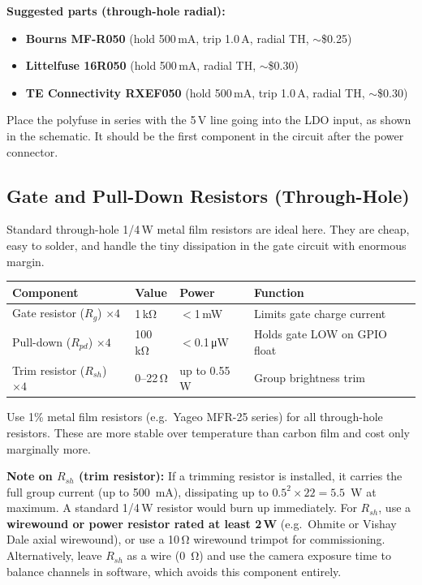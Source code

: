 \documentclass[12pt,letterpaper]{article}
\begin{document}
\textbf{Suggested parts (through-hole radial):}
\begin{itemize}[leftmargin=2em]
  \item \textbf{Bourns MF-R050} (hold 500\,mA, trip 1.0\,A, radial TH, $\sim$\$0.25)
  \item \textbf{Littelfuse 16R050} (hold 500\,mA, radial TH, $\sim$\$0.30)
  \item \textbf{TE Connectivity RXEF050} (hold 500\,mA, trip 1.0\,A, radial TH, $\sim$\$0.30)
\end{itemize}

Place the polyfuse in series with the 5\,V line going into the LDO input, as shown in
the schematic. It should be the first component in the circuit after the power connector.

\subsection{Gate and Pull-Down Resistors (Through-Hole)}

Standard through-hole 1/4\,W metal film resistors are ideal here. They are cheap, easy
to solder, and handle the tiny dissipation in the gate circuit with enormous margin.

\begin{center}
\begin{tabular}{llll}
\toprule
\textbf{Component} & \textbf{Value} & \textbf{Power} & \textbf{Function} \\
\midrule
Gate resistor ($R_g$) $\times 4$ & 1\,k\si{\ohm} & $<$1\,mW & Limits gate charge current \\
Pull-down ($R_{pd}$) $\times 4$ & 100\,k\si{\ohm} & $<$0.1\,\si{\micro W} & Holds gate LOW on GPIO float \\
Trim resistor ($R_{sh}$) $\times 4$ & 0--22\,\si{\ohm} & up to 0.55\,W & Group brightness trim \\
\bottomrule
\end{tabular}
\end{center}

Use 1\% metal film resistors (e.g.\ Yageo MFR-25 series) for all through-hole resistors.
These are more stable over temperature than carbon film and cost only marginally more.

\textbf{Note on $R_{sh}$ (trim resistor):} If a trimming resistor is installed, it
carries the full group current (up to 500~mA), dissipating up to $0.5^2 \times 22 = 5.5$~W
at maximum. A standard 1/4\,W resistor would burn up immediately. For $R_{sh}$, use a
\textbf{wirewound or power resistor rated at least 2\,W} (e.g.\ Ohmite or Vishay Dale
axial wirewound), or use a 10\,\si{\ohm} wirewound trimpot for commissioning.
Alternatively, leave $R_{sh}$ as a wire (0~\si{\ohm}) and use the camera exposure time
to balance channels in software, which avoids this component entirely.
\end{document}
